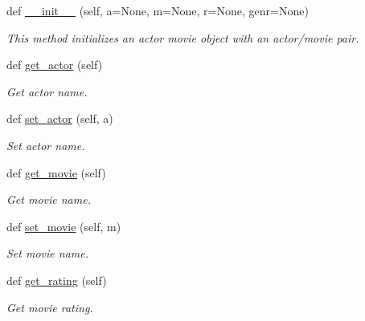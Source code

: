 \begin{DoxyCompactItemize}
\item 
def \mbox{\hyperlink{classbridges_1_1data__src__dependent_1_1actor__movie__imdb_1_1_actor_movie_i_m_d_b_add733f3ecfc9282d102cee6bf5e20674}{\+\_\+\+\_\+init\+\_\+\+\_\+}} (self, a=None, m=None, r=None, genr=None)
\begin{DoxyCompactList}\small\item\em This method initializes an actor movie object with an actor/movie pair. \end{DoxyCompactList}\item 
def \mbox{\hyperlink{classbridges_1_1data__src__dependent_1_1actor__movie__imdb_1_1_actor_movie_i_m_d_b_aa15610e743857b5834b2620d8c05c0b5}{get\+\_\+actor}} (self)
\begin{DoxyCompactList}\small\item\em Get actor name. \end{DoxyCompactList}\item 
def \mbox{\hyperlink{classbridges_1_1data__src__dependent_1_1actor__movie__imdb_1_1_actor_movie_i_m_d_b_ab55fca0c5ee3019ba7e75b8d7d357920}{set\+\_\+actor}} (self, a)
\begin{DoxyCompactList}\small\item\em Set actor name. \end{DoxyCompactList}\item 
def \mbox{\hyperlink{classbridges_1_1data__src__dependent_1_1actor__movie__imdb_1_1_actor_movie_i_m_d_b_a311b63777e31e99eecf455cc4c84ac10}{get\+\_\+movie}} (self)
\begin{DoxyCompactList}\small\item\em Get movie name. \end{DoxyCompactList}\item 
def \mbox{\hyperlink{classbridges_1_1data__src__dependent_1_1actor__movie__imdb_1_1_actor_movie_i_m_d_b_a8577d048a3cf0542b10b43009a413aae}{set\+\_\+movie}} (self, m)
\begin{DoxyCompactList}\small\item\em Set movie name. \end{DoxyCompactList}\item 
def \mbox{\hyperlink{classbridges_1_1data__src__dependent_1_1actor__movie__imdb_1_1_actor_movie_i_m_d_b_ae51c45e543ac1c7fa5d6525d1a74e7d5}{get\+\_\+rating}} (self)
\begin{DoxyCompactList}\small\item\em Get movie rating. \end{DoxyCompactList}\item 

\end{DoxyCompactItemize}
